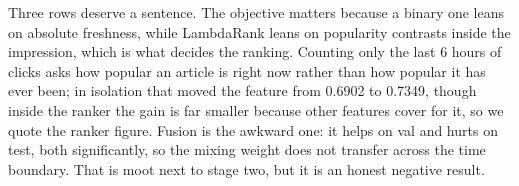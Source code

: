 Three rows deserve a sentence. The objective matters because a binary one leans on absolute
freshness, while LambdaRank leans on popularity contrasts inside the impression, which is what
decides the ranking. Counting only the last 6 hours of clicks asks how popular an article is right
now rather than how popular it has ever been; in isolation that moved the feature from 0.6902 to
0.7349, though inside the ranker the gain is far smaller because other features cover for it, so we
quote the ranker figure. Fusion is the awkward one: it helps on val and hurts on test, both
significantly, so the mixing weight does not transfer across the time boundary. That is moot next
to stage two, but it is an honest negative result.

